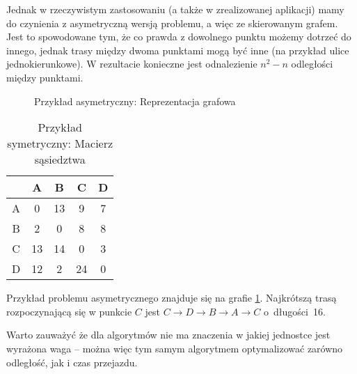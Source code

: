 Jednak w rzeczywistym zastosowaniu (a także w zrealizowanej aplikacji) mamy do czynienia z asymetryczną wersją problemu, a więc ze skierowanym grafem. Jest to spowodowane tym, że co prawda z dowolnego punktu możemy dotrzeć do innego, jednak trasy między dwoma punktami mogą być inne (na przykład ulice jednokierunkowe). W rezultacie konieczne jest odnalezienie $n^2-n$ odległości między punktami.
\begin{figure}[t!]
	\centering
	\def\svgwidth{0.6\columnwidth}
	
	\caption{Przykład asymetryczny: Reprezentacja grafowa}
	\label{fig:przyklad2_komiwojazer_graf}
\end{figure}

\begin{table}[H]
	\begin{center}
		\begin{tabular}
			{  c | c c c c }
			& A & B & C & D \\
			\hline
			A & 0  & 13 & 9  &  7 \\
			B & 2  & 0  & 8  &  8 \\
			C & 13 & 14 & 0  &  3 \\
			D & 12 & 2  & 24 &  0 \\
		\end{tabular}
	\end{center}
	\caption{Przykład symetryczny: Macierz sąsiedztwa}
\end{table}

Przykład problemu asymetrycznego znajduje się na grafie \ref{fig:przyklad2_komiwojazer_graf}. Najkrótszą trasą rozpoczynającą się w punkcie $C$ jest $C \to D \to B \to A \to C$ o~długości~16.

Warto zauważyć że dla algorytmów nie ma znaczenia w jakiej jednostce jest wyrażona waga -- można więc tym samym algorytmem optymalizować zarówno odległość, jak i czas przejazdu.

\clearpage
